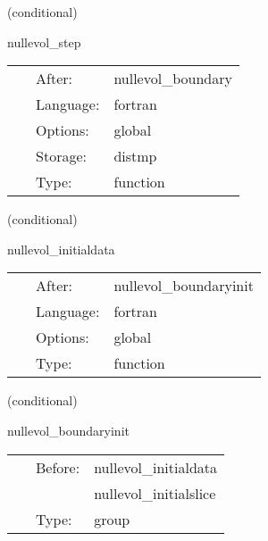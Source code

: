 \vspace{5mm}

   (conditional) 

\hspace{5mm} nullevol\_step 

\hspace{5mm}{\it evolution } 


\hspace{5mm}

 \begin{tabular*}{160mm}{cll} 
~ & After:  & nullevol\_boundary \\ 
~ & Language:  & fortran \\ 
~ & Options:  & global \\ 
~ & Storage:  & distmp \\ 
~ & Type:  & function \\ 
\end{tabular*} 


\vspace{5mm}

   (conditional) 

\hspace{5mm} nullevol\_initialdata 

\hspace{5mm}{\it give j on the initial null hypersurface } 


\hspace{5mm}

 \begin{tabular*}{160mm}{cll} 
~ & After:  & nullevol\_boundaryinit \\ 
~ & Language:  & fortran \\ 
~ & Options:  & global \\ 
~ & Type:  & function \\ 
\end{tabular*} 


\vspace{5mm}

   (conditional) 

\hspace{5mm} nullevol\_boundaryinit 

\hspace{5mm}{\it boundary data for the characteristic data } 


\hspace{5mm}

 \begin{tabular*}{160mm}{cll} 
~ & Before:  & nullevol\_initialdata \\ 
~& ~ &nullevol\_initialslice\\ 
~ & Type:  & group \\ 
\end{tabular*} 


